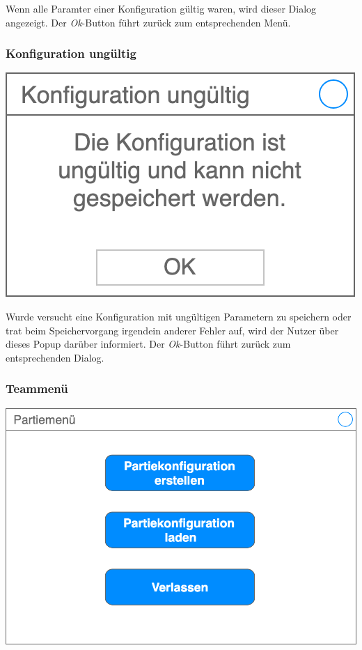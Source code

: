 \documentclass[a4paper,12pt,
headsepline,           %
oneside,               %
pointlessnumbers,      %
bibtotoc,              %
]{scrartcl}
\begin{document}
	Wenn alle Paramter einer Konfiguration gültig waren, wird dieser Dialog angezeigt. Der \textit{Ok}-Button führt zurück zum entsprechenden Menü.
	
	\subsubsection{Konfiguration ungültig}
	
	\includegraphics[scale=0.2]{images/konfiguration_ungueltig}
	
	Wurde versucht eine Konfiguration mit ungültigen Parametern zu speichern oder trat beim Speichervorgang irgendein anderer Fehler auf, wird der Nutzer über dieses Popup darüber informiert. Der \textit{Ok}-Button führt zurück zum entsprechenden Dialog.
	
	\subsubsection{Teammenü}
	
	\includegraphics[scale=0.2]{images/partiemenue}
	
\end{document}
